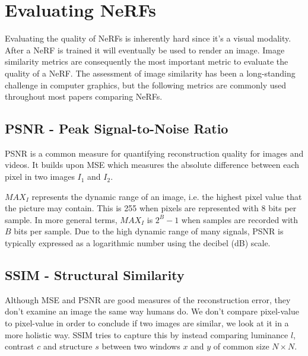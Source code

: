 \section{Evaluating NeRFs} \label{sec:evaluating-nerfs}
Evaluating the quality of NeRFs is inherently hard since it's a visual modality. After a NeRF is trained it will eventually be used to render an image. Image similarity metrics are consequently the most important metric to evaluate the quality of a NeRF. The assessment of image similarity has been a long-standing challenge in computer graphics, but the following metrics are commonly used throughout most papers comparing NeRFs.

\subsection{PSNR - Peak Signal-to-Noise Ratio}
PSNR is a common measure for quantifying reconstruction quality for images and videos. It builds upon MSE which measures the absolute difference between each pixel in two images $I_1$ and $I_2$.



$MAX_I$ represents the dynamic range of an image, i.e. the highest pixel value that the picture may contain. This is 255 when pixels are represented with 8 bits per sample. In more general terms, $MAX_I$ is $2^B-1$ when samples are recorded with $B$ bits per sample. Due to the high dynamic range of many signals, PSNR is typically expressed as a logarithmic number using the decibel (dB) scale.

\subsection{SSIM - Structural Similarity}
Although MSE and PSNR are good measures of the reconstruction error, they don't examine an image the same way humans do. We don't compare pixel-value to pixel-value in order to conclude if two images are similar, we look at it in a more holistic way. SSIM tries to capture this by instead comparing luminance $l$, contrast $c$ and structure $s$ between two windows $x$ and $y$ of common size $N \times N$.



\begin{comment}
\begin{itemize}
    \item $\mu$ represents the pixel sample mean for both $x$ and $y$,
    \item $\sigma^2$ represents the variance for both $x$ and $y$,
    \item $\sigma_{xy}$ represents the covariance of x and y,
    \item $c_1 = (k_1L)^2$, $c_2 = (k_2L)^2$ are variables to stabilize the division with weak denominator,
    \item $L$ represents the dynamic range of the pixel-values,
    \item $k_1 = 0.01$, $k_2 = 0.03$ by default   
\end{itemize}
\end{comment}

